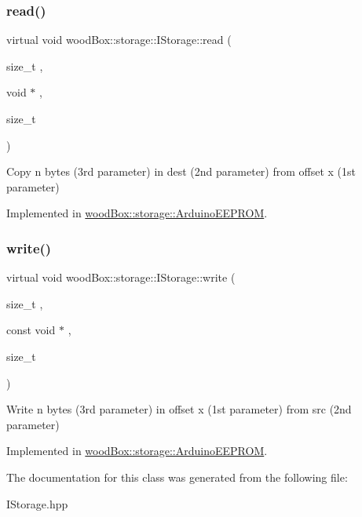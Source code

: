 \subsubsection{\texorpdfstring{read()}{read()}}
{\footnotesize\ttfamily virtual void wood\+Box\+::storage\+::\+I\+Storage\+::read (\begin{DoxyParamCaption}\item[{size\+\_\+t}]{,  }\item[{void $\ast$}]{,  }\item[{size\+\_\+t}]{ }\end{DoxyParamCaption})\hspace{0.3cm}{\ttfamily [pure virtual]}}

Copy n bytes (3rd parameter) in dest (2nd parameter) from offset x (1st parameter) 

Implemented in \mbox{\hyperlink{classwood_box_1_1storage_1_1_arduino_e_e_p_r_o_m_a1b9deb25ea803456b5450f4e3782fd20}{wood\+Box\+::storage\+::\+Arduino\+E\+E\+P\+R\+OM}}.

\mbox{\label{classwood_box_1_1storage_1_1_i_storage_a5eb82c922e8a3147ddab510706be8e24}} 
\subsubsection{\texorpdfstring{write()}{write()}}
{\footnotesize\ttfamily virtual void wood\+Box\+::storage\+::\+I\+Storage\+::write (\begin{DoxyParamCaption}\item[{size\+\_\+t}]{,  }\item[{const void $\ast$}]{,  }\item[{size\+\_\+t}]{ }\end{DoxyParamCaption})\hspace{0.3cm}{\ttfamily [pure virtual]}}

Write n bytes (3rd parameter) in offset x (1st parameter) from src (2nd parameter) 

Implemented in \mbox{\hyperlink{classwood_box_1_1storage_1_1_arduino_e_e_p_r_o_m_af78d2077806af7e1aac65d6890915d77}{wood\+Box\+::storage\+::\+Arduino\+E\+E\+P\+R\+OM}}.



The documentation for this class was generated from the following file\+:\begin{DoxyCompactItemize}
\item 
I\+Storage.\+hpp\end{DoxyCompactItemize}
